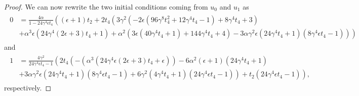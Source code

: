 \documentclass[10pt]{article}
\theoremstyle{plain}
\theoremstyle{definition}
\theoremstyle{plain}
\begin{document}
\begin{proof}
	We can now rewrite the two initial conditions coming from $u_0$ and $u_1$ as 
 \begin{align}\label{eq:1-cut condition 2}
 \begin{split}
		0&=\frac{4 \alpha}{1-24 \gamma ^4 \epsilon t_{4}} \left((\epsilon+1) t_{2}+2 t_{4} \left(3 \gamma ^2 \left(-2 \epsilon
 \left(96 \gamma ^8 t_{4}^2+12 \gamma ^4 t_{4}-1\right)+8 \gamma ^4
 t_{4}+3\right) \right.\right.\\
 &\left.\left.+\alpha ^3 \epsilon \left(24 \gamma ^4 (2 \epsilon+3)
 t_{4}+1\right)+\alpha ^2 \left(3 \epsilon \left(40 \gamma ^4 t_{4}+1\right)+144 \gamma
 ^4 t_{4}+4\right)-3 \alpha \gamma ^2 \epsilon \left(24 \gamma ^4 t_{4}+1\right) \left(8
 \gamma ^4 \epsilon t_{4}-1\right)\right)\right)
 \end{split}
	\end{align}
 and
	\begin{align}\label{eq:1-cut condition 1}
 \begin{split}
		1&= \frac{4 \gamma^2}{24 \gamma ^4 \epsilon
 t_{4}-1} \left(2 t_{4} \left(-\left(\alpha ^3 \left(24 \gamma ^4 \epsilon (2
 \epsilon+3) t_{4}+\epsilon\right)\right)-6 \alpha ^2 (\epsilon+1) \left(24 \gamma ^4
 t_{4}+1\right)\right. \right.\\
 &\left. \left.+3 \alpha \gamma ^2 \epsilon \left(24 \gamma ^4 t_{4}+1\right) \left(8
 \gamma ^4 \epsilon t_{4}-1\right)+6 \gamma ^2 \left(4 \gamma ^4 t_{4}+1\right) \left(24
 \gamma ^4 \epsilon t_{4}-1\right)\right)+t_{2}(24 \gamma ^4 \epsilon
 t_{4}-1)\right),
 \end{split}
	\end{align}
	respectively.
\end{proof}
\end{document}

